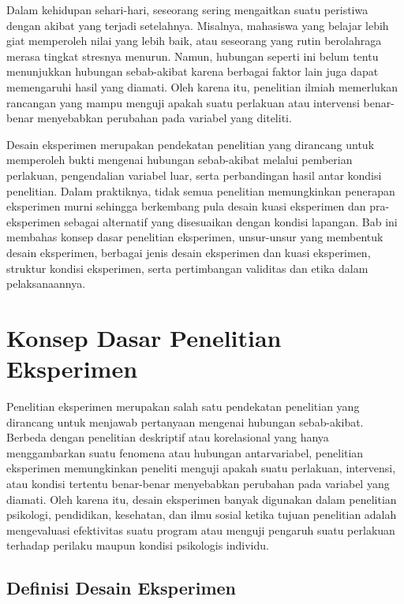 \documentclass[
  indonesian,
  letterpaper,
  DIV=11,
  numbers=noendperiod]{scrreprt}
\begin{document}
Dalam kehidupan sehari-hari, seseorang sering mengaitkan suatu peristiwa
dengan akibat yang terjadi setelahnya. Misalnya, mahasiswa yang belajar
lebih giat memperoleh nilai yang lebih baik, atau seseorang yang rutin
berolahraga merasa tingkat stresnya menurun. Namun, hubungan seperti ini
belum tentu menunjukkan hubungan sebab-akibat karena berbagai faktor
lain juga dapat memengaruhi hasil yang diamati. Oleh karena itu,
penelitian ilmiah memerlukan rancangan yang mampu menguji apakah suatu
perlakuan atau intervensi benar-benar menyebabkan perubahan pada
variabel yang diteliti.

Desain eksperimen merupakan pendekatan penelitian yang dirancang untuk
memperoleh bukti mengenai hubungan sebab-akibat melalui pemberian
perlakuan, pengendalian variabel luar, serta perbandingan hasil antar
kondisi penelitian. Dalam praktiknya, tidak semua penelitian
memungkinkan penerapan eksperimen murni sehingga berkembang pula desain
kuasi eksperimen dan pra-eksperimen sebagai alternatif yang disesuaikan
dengan kondisi lapangan. Bab ini membahas konsep dasar penelitian
eksperimen, unsur-unsur yang membentuk desain eksperimen, berbagai jenis
desain eksperimen dan kuasi eksperimen, struktur kondisi eksperimen,
serta pertimbangan validitas dan etika dalam pelaksanaannya.

\section{Konsep Dasar Penelitian
Eksperimen}\label{konsep-dasar-penelitian-eksperimen}

Penelitian eksperimen merupakan salah satu pendekatan penelitian yang
dirancang untuk menjawab pertanyaan mengenai hubungan sebab-akibat.
Berbeda dengan penelitian deskriptif atau korelasional yang hanya
menggambarkan suatu fenomena atau hubungan antarvariabel, penelitian
eksperimen memungkinkan peneliti menguji apakah suatu perlakuan,
intervensi, atau kondisi tertentu benar-benar menyebabkan perubahan pada
variabel yang diamati. Oleh karena itu, desain eksperimen banyak
digunakan dalam penelitian psikologi, pendidikan, kesehatan, dan ilmu
sosial ketika tujuan penelitian adalah mengevaluasi efektivitas suatu
program atau menguji pengaruh suatu perlakuan terhadap perilaku maupun
kondisi psikologis individu.

\subsection{Definisi Desain
Eksperimen}\label{definisi-desain-eksperimen}
\end{document}
